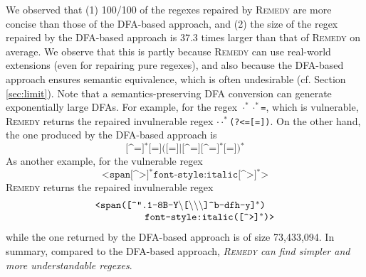 \documentclass[conference]{IEEEtran}
\newcommand{\tool}{\textsc{Remedy}}
\newcommand{\any}{\cdot}
\newcommand{\tchanged}[2]{#2}
\newcommand{\texcomment}[1]{}
\begin{document}
We observed that (1) 100/100 of the regexes repaired by \tool{} are more concise than those of the DFA-based approach, and (2) the size of the regex repaired by the DFA-based approach is 37.3 times larger than that of \tool{} on average.
We observe that this is partly because \tool{} can use real-world extensions (even for repairing pure regexes), and also because the DFA-based approach ensures semantic equivalence, which is often undesirable (cf. Section \ref{sec:limit}).  Note that a semantics-preserving DFA conversion can generate exponentially large DFAs.
For example, for the regex \texttt{$\any^*\any^*$=}, which is vulnerable,
\tool{} returns the repaired invulnerable regex \texttt{$\any\any^*$(?<=[=])}.  On the other hand, the one produced by the DFA-based approach is
\[
\texttt{[\textasciicircum=]$^*$[=]([=]|[\textasciicircum=][\textasciicircum=]$^*$[=])$^*$}
\]
As another example, for the vulnerable regex 
\[
\texttt{<span[\textasciicircum>]$^*$}\texttt{font}\texttt{-}\texttt{s}\texttt{t}\texttt{y}\texttt{l}\texttt{e}\texttt{:italic[\textasciicircum>]$^*$>}
\]
\tool{} returns the repaired invulnerable regex 
\[
\begin{array}{l}
\texttt{<span([\textasciicircum".1-8B-Y$\backslash$[$\backslash\backslash\backslash$]\textasciicircum b-dfh-y]$^*$)}\\
\hspace{5em} \texttt{font}\texttt{-}\texttt{s}\texttt{t}\texttt{y}\texttt{l}\texttt{e}\texttt{:}\texttt{i}\texttt{t}\texttt{a\-}\texttt{l}\texttt{i}\texttt{c}\texttt{([\textasciicircum>]$^*$)>}
\end{array}
\]
while the one returned by the DFA-based approach is of size 73,433,094.
In summary, compared to the DFA-based approach, {\em \tool{} can find simpler and more understandable regexes}.

\texcomment{
\tchanged{}{
Finally, we compare \tool{} with global ReDoS avoidance mechanisms.
Some regex engines incorporate the functionalities to limit the number of backtrackings such as the {\tt pcre.backtrack\_limit} option of PHP or set a timeout limit such as the {\tt Regex.MatchTimeout} property of .NET to defend against ReDoS threats. 
However, the functionalities suffer from the problem that determining a proper limit is non-trivial~\cite{revealear}, which sometimes lead to program bugs or fail to avoid ReDoS, and are not always an option.


In summary, {\em \tool{} offers a complementary solution to ReDoS by repairing vulnerable regexes to secure ones that do not need externally-forced backtracking limits, and therefore are free of these bugs.} Additionally, {\em \tool{} offers a solution that is language/library independent.}

}
}
\end{document}
